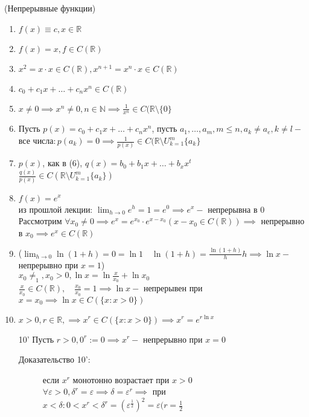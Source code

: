 \begin{eg} (Непрерывные функции)
    \begin{enumerate}
        \item $f(x) \equiv c, x \in \mathbb{R}$
        \item $f(x)=x, f \in C(\mathbb{R})$
        \item $x^2=x \cdot x \in C(\mathbb{R}), x^{n+1} = x^n \cdot x \in C(\mathbb{R})$ 
        \item $c_0 + c_1x + \ldots + c_n x^n \in C(\mathbb{R})$
        \item $x\neq 0 \implies x^n \neq 0, n \in \mathbb{N} \implies \displaystyle\frac{1}{x^n} \in C(\mathbb{R} \setminus \{0\}$
        \item Пусть $p(x) = c_0 + c_1x + \ldots + c_n x^n$, пусть $a_1, \ldots, a_m, m\le n, a_k \neq a _e, k \neq l -$ все числа$: p(a_k) = 0 \implies \displaystyle\frac{1}{p(x)} \in C(\mathbb{R} \setminus U^m_{k=1} \{a_k\}$
        \item $p(x)$, как в (6),  $q(x) = b_0 + b_1x + \ldots + b_x x^t$\\
            $\displaystyle\frac{q(x)}{p(x)} \in C(\mathbb{R} \setminus U^m_{k=1} \{a_k\})$
        \item $f(x) = e^x$\\
            из прошлой лекции:  $\displaystyle\lim_{h \to 0} e^h = 1 = e^0 \implies e^x -$ непрерывна в $0$\\
            Рассмотрим  $\forall x_0 \neq 0 \implies e^x = e^{x_0}  \cdot  e^{x-x_0} (x - x_0 \in C(\mathbb{R})) \implies$ непрерывно в $x_0 \implies  e^x \in C(\mathbb{R})$
        \item ($\displaystyle\lim_{h \to 0} \ln {(1 + h)} = 0 = \ln {1} \quad \ln {(1+h)} = \displaystyle\frac{\ln {(1+h)}}{h}h \implies \ln {x} -$  непрерывно при $x=1$)\\
            $x_0\neq_1, x_0 > 0, \ln {x}  = \ln {\displaystyle\frac{x}{x_0} + \ln {x_0} } $ \\
            $\displaystyle\frac{x}{x_0} \in C(\mathbb{R}), \quad \displaystyle\frac{x_0}{x_0} = 1 \implies \ln {x} -$ непрерывен при $x = x_0 \implies \ln {x} \in C(\{x: x > 0\}) $
        \item $x > 0, r \in \mathbb{R}, \implies x^r \in C(\{x: x>0\}) \implies x^r = e^{r \ln {x}}$
        \item[10'] Пусть $r>0, 0^r := 0 \implies x^r -$ непрерывно при $x = 0$\\
            \begin{description}
                \item[Доказательство 10':] если $x^r$ монотонно возрастает при  $x > 0$ \\
                    $\forall \varepsilon > 0, \delta^r = \varepsilon \implies \delta = \varepsilon^r \implies$  при $x < \delta: 0 <x^r< \delta^r = (\varepsilon^{\displaystyle\frac{1}{2}})^2 = \varepsilon (r = \displaystyle\frac{1}{2}$ \\


\end{description}
\end{enumerate}
\end{eg}
